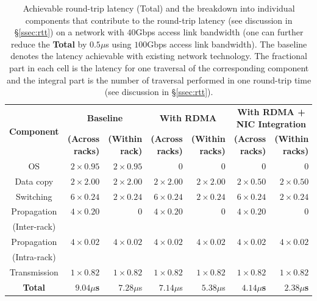 %
\begin{table}
  \centering
  \begin{tabular}{c|r|r|r|r|r|r}
		\multirow{2}{*}{\bf Component} & \multicolumn{2}{c|}{\bf Baseline} &  \multicolumn{2}{c|}{\bf With RDMA} &  \multicolumn{2}{c}{\bf With RDMA + NIC Integration}\\
				 &  {\bf (Across racks)} &  {\bf (Within rack)} & {\bf (Across racks)} &  {\bf (Within racks)} & {\bf (Across racks)} &  {\bf (Within racks)} \\\hline	\hline
    OS & $2 \times 0.95$ & $2 \times 0.95$ & $0$ & $0$ & $0$ & $0$\\\hline
    Data copy & $2 \times 2.00$ &  $2 \times 2.00$ & $2 \times 2.00$ & $2 \times 2.00$ & $2 \times 0.50$ & $2 \times 0.50$\\\hline
    Switching & $6 \times 0.24$ &  $2 \times 0.24$ & $6 \times 0.24$ & $2 \times 0.24$ & $6 \times 0.24$ & $2 \times 0.24$ \\\hline
    Propagation & $4 \times 0.20$ & $0$ & $4 \times 0.20$ & $0$ & $4 \times 0.20$ & $0$\\
    (Inter-rack) &  &   & & & &\\\hline
    Propagation & $4 \times 0.02$ & $4 \times 0.02$ & $4 \times 0.02$ & $4 \times 0.02$ & $4 \times 0.02$ & $4 \times 0.02$\\
    (Intra-rack) &  &   & & & \\\hline
    Transmission & $1 \times 0.82$ & $1 \times 0.82$ & $1 \times 0.82$ & $1 \times 0.82$ & $1 \times 0.82$ & $1 \times 0.82$\\\hline
    \hline
    {\bf Total} & {\bf $9.04\mu$s} & {$7.28\mu$s} & {$7.14\mu$s} & {$5.38\mu$s} & {\bf $4.14\mu$s} & {\bf $2.38\mu$s}\\\hline
	\hline
  \end{tabular}
  \vspace{0.1in}
  \caption{\small{Achievable round-trip latency (Total) and the breakdown into individual components that contribute to the round-trip latency (see discussion in \S\ref{ssec:rtt}) on a network with $40$Gbps access link bandwidth (one can further reduce the {\bf Total} by $0.5\mu$s using $100$Gbps access link bandwidth). The baseline denotes the latency achievable with existing network technology. The fractional part in each cell is the latency for one traversal of the corresponding component and the integral part is the number of traversal performed in one round-trip time (see discussion in \S\ref{ssec:rtt}).}}
  \label{tab:latency}
\end{table}
%
